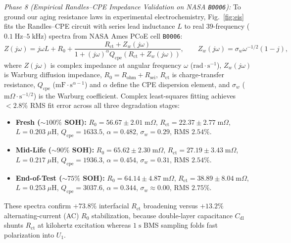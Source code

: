 \documentclass[10pt,a4paper]{article}
\providecommand{\upmu}{\mu}
\begin{document}
\emph{Phase 8 (Empirical Randles--CPE Impedance Validation on NASA \texttt{B0006}):} To ground our aging resistance laws in experimental electrochemistry, Fig.~\ref{fig:eis} fits the Randles--CPE circuit with series lead inductance $L$ to real $39$-frequency ($0.1\;\mathrm{Hz}\text{--}5\;\mathrm{kHz}$) spectra from NASA Ames PCoE cell \texttt{B0006}:
\begin{equation}\label{eqn:eis_randles}
Z(j\omega) = j\omega L + R_0 + \frac{R_{\text{ct}} + Z_w(j\omega)}{1 + (j\omega)^\alpha Q_{\text{cpe}} \left(R_{\text{ct}} + Z_w(j\omega)\right)}, \qquad Z_w(j\omega) = \sigma_w \omega^{-1/2}(1 - j),
\end{equation}
where $Z(j\omega)$ is complex impedance at angular frequency $\omega$ ($\mathrm{rad}\cdot\mathrm{s}^{-1}$), $Z_w(j\omega)$ is Warburg diffusion impedance, $R_0 = R_{\text{ohm}} + R_{\text{sei}}$, $R_{\text{ct}}$ is charge-transfer resistance, $Q_{\text{cpe}}$ ($\mathrm{mF}\cdot\mathrm{s}^{\alpha-1}$) and $\alpha$ define the CPE dispersion element, and $\sigma_w$ ($\mathrm{m}\Omega\cdot\mathrm{s}^{-1/2}$) is the Warburg coefficient. Complex least-squares fitting achieves $<2.8\%$ RMS fit error across all three degradation stages:
\begin{itemize}
\item \textbf{Fresh ($\sim 100\%$ SOH):} $R_0 = 56.67\pm 2.01\;\mathrm{m}\Omega$, $R_{\text{ct}} = 22.37\pm 2.77\;\mathrm{m}\Omega$, $L = 0.203\;\upmu\mathrm{H}$, $Q_{\text{cpe}} = 1633.5$, $\alpha = 0.482$, $\sigma_w = 0.29$, RMS $2.54\%$.
\item \textbf{Mid-Life ($\sim 90\%$ SOH):} $R_0 = 65.62\pm 2.30\;\mathrm{m}\Omega$, $R_{\text{ct}} = 27.19\pm 3.43\;\mathrm{m}\Omega$, $L = 0.217\;\upmu\mathrm{H}$, $Q_{\text{cpe}} = 1936.3$, $\alpha = 0.454$, $\sigma_w = 0.31$, RMS $2.54\%$.
\item \textbf{End-of-Test ($\sim 75\%$ SOH):} $R_0 = 64.14\pm 4.87\;\mathrm{m}\Omega$, $R_{\text{ct}} = 38.89\pm 8.04\;\mathrm{m}\Omega$, $L = 0.253\;\upmu\mathrm{H}$, $Q_{\text{cpe}} = 3037.6$, $\alpha = 0.344$, $\sigma_w \approx 0.00$, RMS $2.75\%$.
\end{itemize}
These spectra confirm $+73.8\%$ interfacial $R_{\text{ct}}$ broadening versus $+13.2\%$ alternating-current (AC) $R_0$ stabilization, because double-layer capacitance $C_{\text{dl}}$ shunts $R_{\text{ct}}$ at kilohertz excitation whereas $1\;\mathrm{s}$ BMS sampling folds fast polarization into $U_1$.
\end{document}
